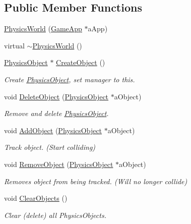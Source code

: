 \subsection*{Public Member Functions}
\begin{DoxyCompactItemize}
\item 
\hyperlink{classPhysicsWorld_ac833ac7fe8d99dccf56d432c60c38340}{Physics\+World} (\hyperlink{classGameApp}{Game\+App} $\ast$a\+App)
\item 
virtual \hyperlink{classPhysicsWorld_abf1573b008b52b60a83a8f36cbdd51bc}{$\sim$\+Physics\+World} ()
\item 
\hyperlink{classPhysicsObject}{Physics\+Object} $\ast$ \hyperlink{classPhysicsWorld_ac20c840fa36bf8a8751b05756bd5d1cb}{Create\+Object} ()
\begin{DoxyCompactList}\small\item\em Create \hyperlink{classPhysicsObject}{Physics\+Object}, set manager to this. \end{DoxyCompactList}\item 
void \hyperlink{classPhysicsWorld_a7f86f0395b7b8cfd3468513f30dfbe04}{Delete\+Object} (\hyperlink{classPhysicsObject}{Physics\+Object} $\ast$a\+Object)
\begin{DoxyCompactList}\small\item\em Remove and delete \hyperlink{classPhysicsObject}{Physics\+Object}. \end{DoxyCompactList}\item 
void \hyperlink{classPhysicsWorld_a2f6b141cb8b1cff4918a59e0270408c0}{Add\+Object} (\hyperlink{classPhysicsObject}{Physics\+Object} $\ast$a\+Object)
\begin{DoxyCompactList}\small\item\em Track object. (Start colliding) \end{DoxyCompactList}\item 
void \hyperlink{classPhysicsWorld_a8d8e7e9ad80a1724a07a41ff829d39b7}{Remove\+Object} (\hyperlink{classPhysicsObject}{Physics\+Object} $\ast$a\+Object)
\begin{DoxyCompactList}\small\item\em Removes object from being tracked. (Will no longer collide) \end{DoxyCompactList}\item 
void \hyperlink{classPhysicsWorld_a3b55fe1717a16ad1946c9fbf00d8f39b}{Clear\+Objects} ()
\begin{DoxyCompactList}\small\item\em Clear (delete) all Physics\+Objects. \end{DoxyCompactList}\item 

\end{DoxyCompactItemize}
